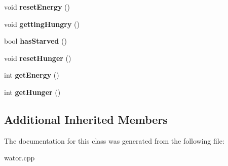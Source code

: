 \begin{DoxyCompactItemize}
\item 
void {\bfseries reset\+Energy} ()\hypertarget{class_shark_ad47381349dcf92fd45ab49d6a39a372a}{}\label{class_shark_ad47381349dcf92fd45ab49d6a39a372a}

\item 
void {\bfseries getting\+Hungry} ()\hypertarget{class_shark_ac6727db0f701b9dadb3b9094a9e59c3a}{}\label{class_shark_ac6727db0f701b9dadb3b9094a9e59c3a}

\item 
bool {\bfseries has\+Starved} ()\hypertarget{class_shark_a37c8f30ffa80566d36a6bf8b95a3ea09}{}\label{class_shark_a37c8f30ffa80566d36a6bf8b95a3ea09}

\item 
void {\bfseries reset\+Hunger} ()\hypertarget{class_shark_aac0480a660143dbb034ef111d572ea9d}{}\label{class_shark_aac0480a660143dbb034ef111d572ea9d}

\item 
int {\bfseries get\+Energy} ()\hypertarget{class_shark_aa3a44c4e3955348efdec5f641f1407ea}{}\label{class_shark_aa3a44c4e3955348efdec5f641f1407ea}

\item 
int {\bfseries get\+Hunger} ()\hypertarget{class_shark_a39472f856ab5b1c3f43d6c156e758054}{}\label{class_shark_a39472f856ab5b1c3f43d6c156e758054}

\end{DoxyCompactItemize}
\subsection*{Additional Inherited Members}


The documentation for this class was generated from the following file\+:\begin{DoxyCompactItemize}
\item 
wator.\+cpp\end{DoxyCompactItemize}
